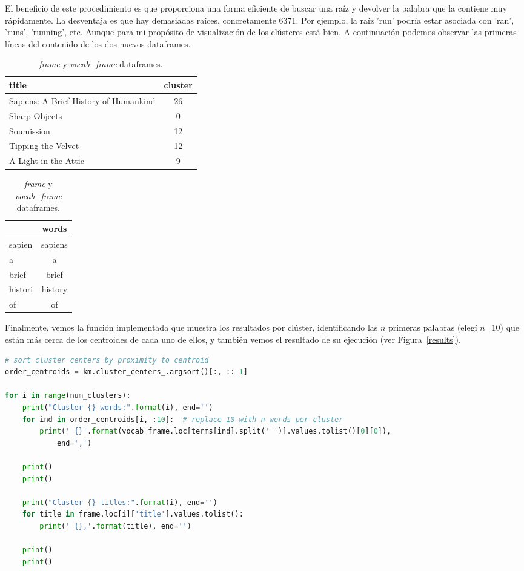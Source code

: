 \documentclass{uimppracticas}
\begin{document}
El beneficio de este procedimiento es que proporciona una forma eficiente de buscar una raíz y devolver la palabra que la contiene muy rápidamente. La desventaja es que hay demasiadas raíces, concretamente 6371. Por ejemplo, la raíz 'run' podría estar asociada con 'ran', 'runs', 'running', etc. Aunque para mi propósito de visualización de los clústeres está bien. A continuación podemos observar las primeras líneas del contenido de los dos nuevos dataframes.

\begin{table}[!htb]
	\centering
	\caption{\textit{frame} y \textit{vocab\_frame} dataframes.}
	\begin{minipage}{.6\linewidth}
		\centering
		\begin{tabular}{lc}
			\toprule
			title &  cluster \\
			\midrule
			Sapiens: A Brief History of Humankind & 26 \\
			Sharp Objects & 0 \\
			Soumission & 12 \\
			Tipping the Velvet & 12 \\
			A Light in the Attic & 9 \\
			\bottomrule
		\end{tabular}
	\end{minipage}%
	\begin{minipage}{.4\linewidth}
		\centering
		\begin{tabular}{lc}
			\toprule
			& words \\
			\midrule
			sapien & sapiens \\
			a & a \\
			brief & brief \\
			histori & history \\
			of & of \\
			\bottomrule
		\end{tabular}
	\end{minipage} 
\end{table}

Finalmente, vemos la función implementada que muestra los resultados por clúster, identificando las $n$ primeras palabras (elegí $n$=10) que están más cerca de los centroides de cada uno de ellos, y también vemos el resultado de su ejecución (ver Figura~\ref{results}). 

\begin{lstlisting}[language=python]
# sort cluster centers by proximity to centroid	
order_centroids = km.cluster_centers_.argsort()[:, ::-1] 

for i in range(num_clusters):
	print("Cluster {} words:".format(i), end='')
	for ind in order_centroids[i, :10]:  # replace 10 with n words per cluster
		print(' {}'.format(vocab_frame.loc[terms[ind].split(' ')].values.tolist()[0][0]), 
			end=',')
	
	print()
	print()
	
	print("Cluster {} titles:".format(i), end='')
	for title in frame.loc[i]['title'].values.tolist():
		print(' {},'.format(title), end='')
	
	print()
	print()
\end{lstlisting}
\end{document}
